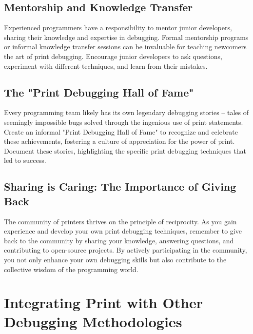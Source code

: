 \documentclass{article}
\begin{document}
{{{{\subsection*{Mentorship and Knowledge Transfer}

Experienced programmers have a responsibility to mentor junior developers, sharing their knowledge and expertise in debugging. Formal mentorship programs or informal knowledge transfer sessions can be invaluable for teaching newcomers the art of print debugging. Encourage junior developers to ask questions, experiment with different techniques, and learn from their mistakes.

\subsection*{The "Print Debugging Hall of Fame"}

Every programming team likely has its own legendary debugging stories – tales of seemingly impossible bugs solved through the ingenious use of print statements. Create an informal "Print Debugging Hall of Fame" to recognize and celebrate these achievements, fostering a culture of appreciation for the power of print. Document these stories, highlighting the specific print debugging techniques that led to success.

\subsection*{Sharing is Caring: The Importance of Giving Back}

The community of printers thrives on the principle of reciprocity. As you gain experience and develop your own print debugging techniques, remember to give back to the community by sharing your knowledge, answering questions, and contributing to open-source projects. By actively participating in the community, you not only enhance your own debugging skills but also contribute to the collective wisdom of the programming world.

\newpage

\section*{Integrating Print with Other Debugging Methodologies} %
\label{chapter-10-6-Integrating_Print_with_Other_Debugging_M}

}}}}
\end{document}
